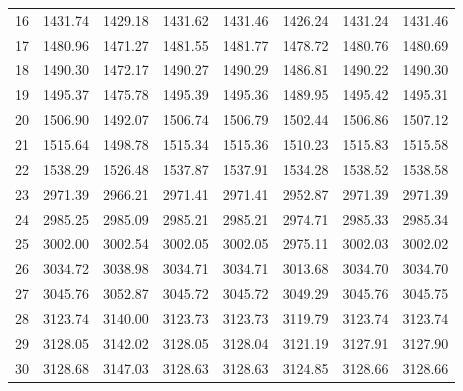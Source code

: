 \documentclass[10pt,oneside]{article}
\begin{document}
\begin{table}[h!]
\begin{tabular}{cccccccc}
16 &   1431.74 & 1429.18 & 1431.62 & 1431.46 &      1426.24 & 1431.24 & 1431.46 \\
17 &   1480.96 & 1471.27 & 1481.55 & 1481.77 &      1478.72 & 1480.76 & 1480.69 \\
18 &   1490.30 & 1472.17 & 1490.27 & 1490.29 &      1486.81 & 1490.22 & 1490.30 \\
19 &   1495.37 & 1475.78 & 1495.39 & 1495.36 &      1489.95 & 1495.42 & 1495.31 \\
20 &   1506.90 & 1492.07 & 1506.74 & 1506.79 &      1502.44 & 1506.86 & 1507.12 \\
21 &   1515.64 & 1498.78 & 1515.34 & 1515.36 &      1510.23 & 1515.83 & 1515.58 \\
22 &   1538.29 & 1526.48 & 1537.87 & 1537.91 &      1534.28 & 1538.52 & 1538.58 \\
23 &   2971.39 & 2966.21 & 2971.41 & 2971.41 &      2952.87 & 2971.39 & 2971.39 \\
24 &   2985.25 & 2985.09 & 2985.21 & 2985.21 &      2974.71 & 2985.33 & 2985.34 \\
25 &   3002.00 & 3002.54 & 3002.05 & 3002.05 &      2975.11 & 3002.03 & 3002.02 \\
26 &   3034.72 & 3038.98 & 3034.71 & 3034.71 &      3013.68 & 3034.70 & 3034.70 \\
27 &   3045.76 & 3052.87 & 3045.72 & 3045.72 &      3049.29 & 3045.76 & 3045.75 \\
28 &   3123.74 & 3140.00 & 3123.73 & 3123.73 &      3119.79 & 3123.74 & 3123.74 \\
29 &   3128.05 & 3142.02 & 3128.05 & 3128.04 &      3121.19 & 3127.91 & 3127.90 \\
30 &   3128.68 & 3147.03 & 3128.63 & 3128.63 &      3124.85 & 3128.66 & 3128.66 \\
\bottomrule
\end{tabular}
\end{table}

\clearpage
\end{document}
